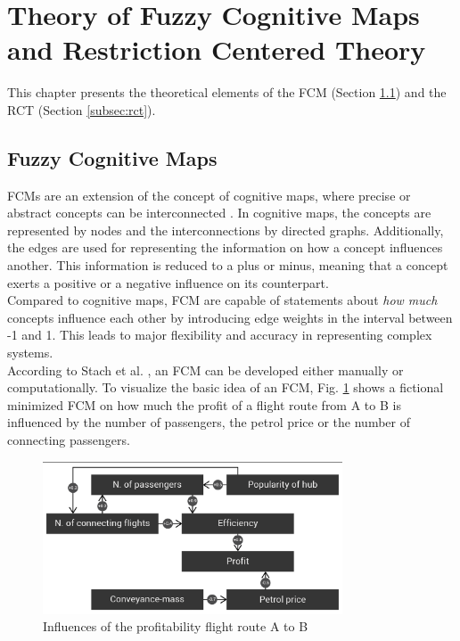 \documentclass[conference]{IEEEtran}
\begin{document}
\section{Theory of Fuzzy Cognitive Maps and Restriction Centered Theory}
\label{sec:theory}
This chapter presents the theoretical elements of the FCM (Section \ref{subsec:fcm}) and the RCT (Section \ref{subsec:rct}).
\subsection{Fuzzy Cognitive Maps}
\label{subsec:fcm}

FCMs are an extension of the concept of cognitive maps, where precise or abstract concepts can be interconnected \cite{kosko1986}. In cognitive maps, the concepts are represented by nodes and the interconnections by directed graphs. Additionally, the edges are used for representing the information on how a concept influences another. This information is reduced to a plus or minus, meaning that a concept exerts a positive or a negative influence on its counterpart.\\
Compared to cognitive maps, FCM are capable of statements about \emph{how much} concepts influence each other by introducing edge weights in the interval between -1 and 1. This leads to major flexibility and accuracy in representing complex systems.\\
According to Stach et al. \cite{stach2005}, an FCM can be developed either manually or computationally. To visualize the basic idea of an FCM, Fig. \ref{fig:cm} shows a fictional minimized FCM on how much the profit of a flight route from A to B is influenced by the number of passengers, the petrol price or the number of connecting passengers.

\begin{figure}[ht]
\includegraphics[width=3.5in]{img/ficFCM.png}
\caption{Influences of the profitability flight route A to B}
\label{fig:cm}
\end{figure}
\end{document}

